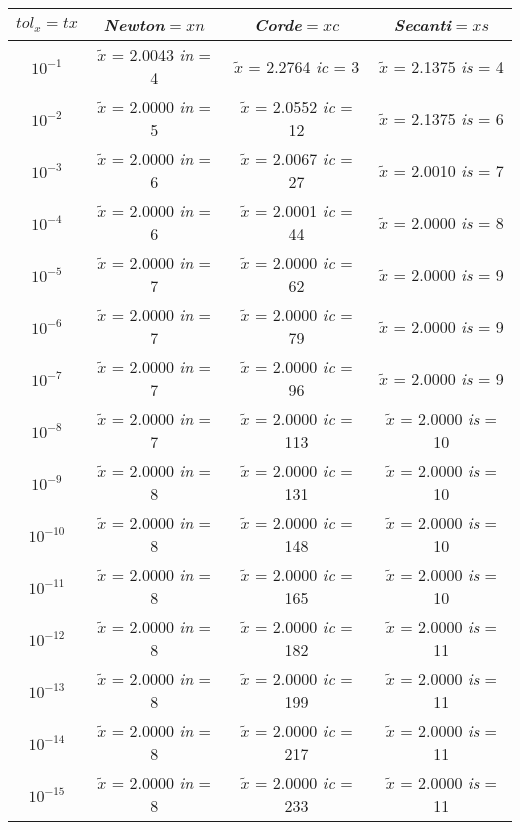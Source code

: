 \begin{center}
	\begin{tabular}{|c|c|c|c|}
		\hline
			$tol_x=tx$ & \textit{Newton}$=xn$ & \textit{Corde}$=xc$ & \textit{Secanti}$=xs$ \\
		\hline
			$10^{-1}$ & $\tilde{x}$ = 2.0043 \quad \textit{in} = 4 & $\tilde{x}$ = 2.2764 \quad \textit{ic} = 3 & $\tilde{x}$ = 2.1375 \quad \textit{is} = 4\\
			$10^{-2}$ & $\tilde{x}$ = 2.0000 \quad \textit{in} = 5 & $\tilde{x}$ = 2.0552 \quad \textit{ic} = 12 & $\tilde{x}$ = 2.1375 \quad \textit{is} = 6\\
			$10^{-3}$ & $\tilde{x}$ = 2.0000 \quad \textit{in} = 6 & $\tilde{x}$ = 2.0067 \quad \textit{ic} = 27 & $\tilde{x}$ = 2.0010 \quad \textit{is} = 7\\
			$10^{-4}$ & $\tilde{x}$ = 2.0000 \quad \textit{in} = 6 & $\tilde{x}$ = 2.0001 \quad \textit{ic} = 44 & $\tilde{x}$ = 2.0000 \quad \textit{is} = 8\\
			$10^{-5}$ & $\tilde{x}$ = 2.0000 \quad \textit{in} = 7 & $\tilde{x}$ = 2.0000 \quad \textit{ic} = 62 & $\tilde{x}$ = 2.0000 \quad \textit{is} = 9\\
			$10^{-6}$ & $\tilde{x}$ = 2.0000 \quad \textit{in} = 7 & $\tilde{x}$ = 2.0000 \quad \textit{ic} = 79 & $\tilde{x}$ = 2.0000 \quad \textit{is} = 9\\
			$10^{-7}$ & $\tilde{x}$ = 2.0000 \quad \textit{in} = 7 & $\tilde{x}$ = 2.0000 \quad \textit{ic} = 96 & $\tilde{x}$ = 2.0000 \quad \textit{is} = 9\\
			$10^{-8}$ & $\tilde{x}$ = 2.0000 \quad \textit{in} = 7 & $\tilde{x}$ = 2.0000 \quad \textit{ic} = 113 & $\tilde{x}$ = 2.0000 \quad \textit{is} = 10\\
			$10^{-9}$ & $\tilde{x}$ = 2.0000 \quad \textit{in} = 8 & $\tilde{x}$ = 2.0000 \quad \textit{ic} = 131 & $\tilde{x}$ = 2.0000 \quad \textit{is} = 10\\
			$10^{-10}$ & $\tilde{x}$ = 2.0000 \quad \textit{in} = 8 & $\tilde{x}$ = 2.0000 \quad \textit{ic} = 148 & $\tilde{x}$ = 2.0000 \quad \textit{is} = 10\\
			$10^{-11}$ & $\tilde{x}$ = 2.0000 \quad \textit{in} = 8 & $\tilde{x}$ = 2.0000 \quad \textit{ic} = 165 & $\tilde{x}$ = 2.0000 \quad \textit{is} = 10\\
			$10^{-12}$ & $\tilde{x}$ = 2.0000 \quad \textit{in} = 8 & $\tilde{x}$ = 2.0000 \quad \textit{ic} = 182 & $\tilde{x}$ = 2.0000 \quad \textit{is} = 11\\
			$10^{-13}$ & $\tilde{x}$ = 2.0000 \quad \textit{in} = 8 & $\tilde{x}$ = 2.0000 \quad \textit{ic} = 199 & $\tilde{x}$ = 2.0000 \quad \textit{is} = 11\\
			$10^{-14}$ & $\tilde{x}$ = 2.0000 \quad \textit{in} = 8 & $\tilde{x}$ = 2.0000 \quad \textit{ic} = 217 & $\tilde{x}$ = 2.0000 \quad \textit{is} = 11\\
			$10^{-15}$ & $\tilde{x}$ = 2.0000 \quad \textit{in} = 8 & $\tilde{x}$ = 2.0000 \quad \textit{ic} = 233 & $\tilde{x}$ = 2.0000 \quad \textit{is} = 11\\
		\hline
	\end{tabular}
\end{center}

